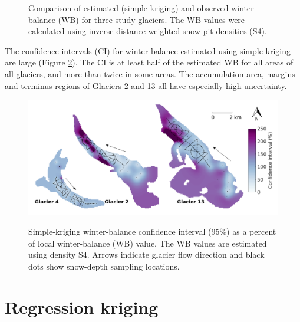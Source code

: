 \documentclass{sfuthesis}
\newcommand{\topomap}{Arrows indicate glacier flow direction and black dots show snow-depth sampling locations. }
\begin{document}
\begin{figure}[H]
	\caption[Comparison of estimated (simple kriging) and observed winter balance (WB) for three study glaciers]{Comparison of estimated (simple kriging) and observed winter balance (WB) for three study glaciers. The WB values were calculated using inverse-distance weighted snow pit densities (S4).}
	\label{fig:R2simplekrig}
\end{figure}

The confidence intervals (CI) for winter balance estimated using simple kriging are large (Figure \ref{fig:krigingCI_percent}). The CI is at least half of the estimated WB for all areas of all glaciers, and more than twice in some areas. The accumulation area, margins and terminus regions of Glaciers 2 and 13 all have especially high uncertainty. 

\begin{figure}[H]
	\centering
	\includegraphics[width = \textwidth]{KrigingCI_percent.png}\\
	\caption[Simple-kriging winter-balance confidence interval (95\%) as a percent of local winter-balance value]{Simple-kriging winter-balance confidence interval (95\%) as a percent of local winter-balance (WB) value. The WB values are estimated using density S4. \topomap}
	\label{fig:krigingCI_percent}
\end{figure}

\section{Regression kriging}
\label{sec:regressionkriging}
\end{document}
